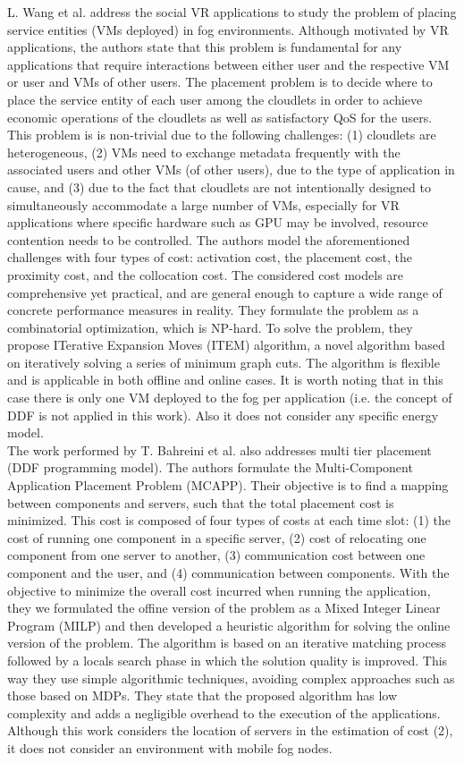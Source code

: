 \noindent\tab L. Wang et al. \cite{wang2018service} address the social VR applications to study the problem of placing service entities (VMs deployed) in fog environments. Although motivated by VR applications, the authors state that this problem is fundamental for any applications that require interactions between either user and the respective VM or user and VMs of other users. The placement problem is to decide where to place the service entity of each user among the cloudlets in order to achieve economic operations of the cloudlets as well as satisfactory QoS for the users. This problem is is non-trivial due to the following challenges: (1) cloudlets are heterogeneous, (2) VMs need to exchange metadata frequently with the associated users and other VMs (of other users), due to the type of application in cause, and (3) due to the fact that cloudlets are not intentionally designed to simultaneously accommodate a large number of VMs, especially for VR applications where specific hardware such as GPU may be involved, resource contention needs to be controlled. The authors model the aforementioned challenges with four types of cost: activation cost, the placement cost, the proximity cost, and the collocation cost. The considered cost models are comprehensive yet practical, and are general enough to capture a wide range of concrete performance measures in reality. They formulate the problem as a combinatorial optimization, which is NP-hard. To solve the problem, they propose ITerative Expansion Moves (ITEM) algorithm, a novel algorithm based on iteratively solving a series of minimum graph cuts. The algorithm is flexible and is applicable in both offline and online cases. It is worth noting that in this case there is only one VM deployed to the fog per application (i.e. the concept of DDF is not applied in this work). Also it does not consider any specific energy model.\\
\noindent\tab The work performed by T. Bahreini et al. \cite{bahreini2017efficient} also addresses multi tier placement (DDF programming model). The authors formulate the Multi-Component Application Placement Problem (MCAPP). Their objective is to find a mapping between components and servers, such that the total placement cost is minimized. This cost is composed of four types of costs at each time slot: (1) the cost of running one component in a specific server, (2) cost of relocating one component from one server to another, (3) communication cost between one component and the user, and (4) communication between components. With the objective to minimize the overall cost incurred when running the application, they we formulated the offine version of the problem as a Mixed Integer Linear Program (MILP) and then developed a heuristic algorithm for solving the online version of the problem. The algorithm is based on an iterative matching process followed by a locals search phase in which the solution quality is improved. This way they use simple algorithmic techniques, avoiding complex approaches such as those based on MDPs. They state that the proposed algorithm has low complexity and adds a negligible overhead to the execution of the applications. Although this work considers the location of servers in the estimation of cost (2), it does not consider an environment with mobile fog nodes.\\
